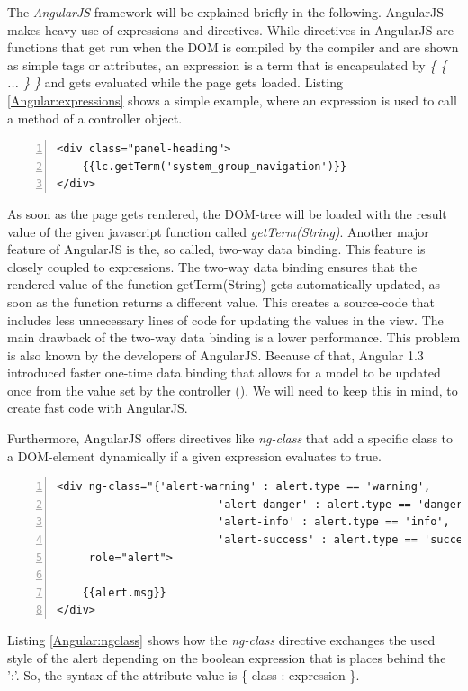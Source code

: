The \textit{AngularJS} framework will be explained briefly in the following. AngularJS makes heavy use of expressions and directives.
While directives in AngularJS are functions that get run when the DOM is compiled by the compiler and are shown as simple tags or attributes, an expression is a term that is encapsulated by \textit{\{ \{ ... \} \}} and gets evaluated while the page gets loaded. Listing \ref{Angular:expressions} shows a simple example, where an expression is used to call a method of a controller object.

\begin{lstlisting}[numbers=left,caption={Simple example that shows the use of expressions},label=Angular:expressions,frame=tlbr,breaklines]
<div class="panel-heading"> 
	{{lc.getTerm('system_group_navigation')}} 
</div>
\end{lstlisting}

As soon as the page gets rendered, the \ac{DOM}-tree will be loaded with the result value of the given javascript function called \textit{getTerm(String)}. 
Another major feature of AngularJS is the, so called, two-way data binding. This feature is closely coupled to expressions. The two-way data binding ensures that the rendered value of the function getTerm(String) gets automatically updated, as soon as the function returns a different value. This creates a source-code that includes less unnecessary lines of code for updating the values in the view. The main drawback of the two-way data binding is a lower performance. This problem is also known by the developers of AngularJS. Because of that, Angular 1.3 introduced faster one-time data binding that allows for a model to be updated once from the value set by the controller (\cite{Peterson:2015aa}). We will need to keep this in mind, to create fast code with AngularJS.

Furthermore, AngularJS offers directives like \textit{ng-class} that add a specific class to a \ac{DOM}-element dynamically if a given expression evaluates to true.

\begin{lstlisting}[numbers=left,caption={Simple example that shows the ng-class directive to change the style respectivly color of an alert depending on its type},label=Angular:ngclass,frame=tlbr,breaklines]
<div ng-class="{'alert-warning' : alert.type == 'warning',
                         'alert-danger' : alert.type == 'danger',
                         'alert-info' : alert.type == 'info',
                         'alert-success' : alert.type == 'success'}"
     role="alert">

	{{alert.msg}}
</div>
\end{lstlisting}
Listing \ref{Angular:ngclass} shows how the \textit{ng-class} directive exchanges the used style of the alert depending on the boolean expression that is places behind the ':'. So, the syntax of the attribute value is \{ class : expression \}.

